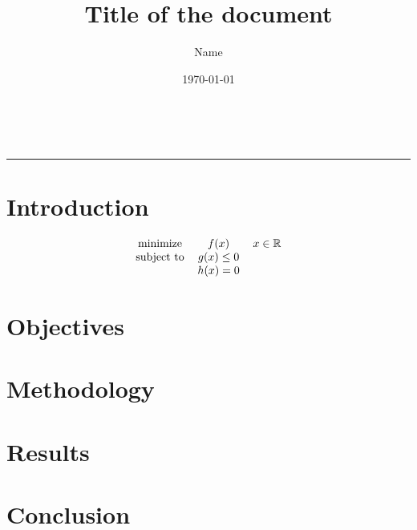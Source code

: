 \documentclass[fontsize=10pt]{article}
\title{
\Large Title of the document  \\
[10pt] 
}
\date{\today}
\author{Name}
\makeatletter
\renewenvironment{abstract} %
 {\small
  \begin{center}
  \bfseries \abstractname\vspace{-.5em}\vspace{0pt}
  \end{center}
  \list{}{%
    \setlength{\leftmargin}{0mm}
    \setlength{\rightmargin}{\leftmargin}%
  }
  \item\relax}
 {\endlist}
\renewcommand{\maketitle}{\bgroup\setlength{\parindent}{0pt} %
\begin{flushleft}
  \textbf{\@title}
  \@author \\ 
  \@date
\end{flushleft}\egroup
}
\makeatother
\begin{document}
 \maketitle

\begin{abstract}
    \lipsum[1]
\end{abstract}

\rule{\linewidth}{0.5pt}


\section{Introduction}
 \lipsum[2]
\begin{equation}  %
      \begin{tabular}{c c c}
           minimize & $f(x)$ & $x \in \mathbb{R} $\\
           subject to & $g(x)\leq 0 $&  \\
           & $h(x) = 0$& \\
      \end{tabular}
  \end{equation}
\lipsum[1]

\section{Objectives}
\lipsum[1-2]



\section{Methodology}
\lipsum[1-2]

\section{Results}
\lipsum[1-2]

\section{Conclusion}
\lipsum [4-5]


\begin{thebibliography}{}
\end{thebibliography}


 
\end{document}
